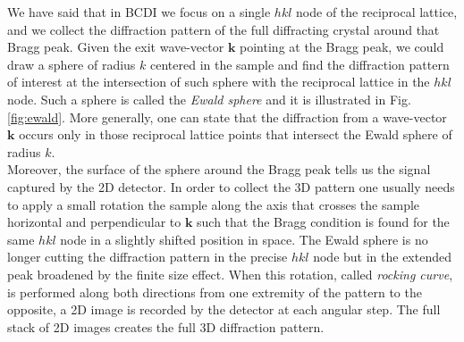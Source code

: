 We have said that in BCDI we focus on a single $hkl$ node of the reciprocal lattice, and we collect the diffraction pattern 
of the full diffracting crystal around that Bragg peak. Given the exit wave-vector $\mathbf{k}$ 
pointing at the Bragg peak, we could draw a sphere of radius $k$ centered in the sample and find the diffraction pattern 
of interest at the intersection of such sphere with the reciprocal lattice in the $hkl$ node.  Such a sphere is called 
the \textit{Ewald sphere} and it is illustrated in Fig. \ref{fig:ewald}. More generally, one can state that the diffraction 
from a wave-vector $\mathbf{k}$ occurs only in those reciprocal lattice points that intersect the Ewald sphere
of radius $k$. \\
Moreover, the surface of the sphere around the Bragg peak tells us the signal captured by the 2D detector. 
In order to collect the 3D pattern one usually needs to apply a small rotation the sample along the axis that crosses the sample horizontal and 
perpendicular to $\mathbf{k}$ such that the Bragg condition is found for the same $hkl$ node in a slightly shifted position in space. 
The Ewald sphere is no longer cutting the diffraction pattern in the precise $hkl$ node but in the extended peak broadened by the 
finite size effect. When this rotation, called \textit{rocking curve}, is performed along both directions from one extremity of 
the pattern to the opposite, a 2D image is recorded by the detector at each angular step. The full stack of 2D images creates 
the full 3D diffraction pattern. 

